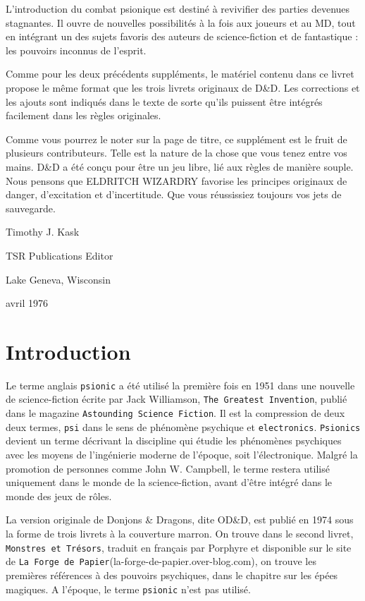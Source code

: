 \documentclass[12pt]{article}
\begin{document}
L'introduction du combat psionique est destiné à revivifier des parties devenues stagnantes. Il ouvre de nouvelles possibilités à la fois aux joueurs et au MD, tout en intégrant un des sujets favoris des auteurs de science-fiction et de fantastique : les pouvoirs inconnus de l'esprit.

Comme pour les deux précédents suppléments, le matériel contenu dans ce livret propose le même format que les trois livrets originaux de D\&D. Les corrections et les ajouts sont indiqués dans le texte de sorte qu'ils puissent être intégrés facilement dans les règles originales.

Comme vous pourrez le noter sur la page de titre, ce supplément est le fruit de plusieurs contributeurs. Telle est la nature de la chose que vous tenez entre vos mains. D\&D a été conçu pour être un jeu libre, lié aux règles de manière souple. Nous pensons que ELDRITCH WIZARDRY favorise les principes originaux de danger, d'excitation et d'incertitude. Que vous réussissiez toujours vos jets de sauvegarde.

\vspace{1cm}

\noindent Timothy J. Kask

\noindent TSR Publications Editor

\noindent Lake Geneva, Wisconsin

 avril 1976

\newpage

\section*{Introduction}

Le terme anglais \texttt{psionic} a été utilisé la première fois en 1951 dans une nouvelle de science-fiction écrite par Jack Williamson, \texttt{The Greatest Invention}, publié dans le magazine \texttt{Astounding Science Fiction}. Il est la compression de deux deux termes, \texttt{psi} dans le sens de phénomène psychique et \texttt{electronics}. \texttt{Psionics} devient un terme décrivant la discipline qui étudie les phénomènes psychiques avec les moyens de l'ingénierie moderne de l'époque, soit l'électronique. Malgré la promotion de personnes comme John W. Campbell, le terme restera utilisé uniquement dans le monde de la science-fiction, avant d'être intégré dans le monde des jeux de rôles.

La version originale de Donjons \& Dragons, dite OD\&D, est publié en 1974 sous la forme de trois livrets à la couverture marron. On trouve dans le second livret, \texttt{Monstres et Trésors}, traduit en français par Porphyre et disponible sur le site de \texttt{La Forge de Papier}(la-forge-de-papier.over-blog.com), on trouve les premières références à des pouvoirs psychiques, dans le chapitre sur les épées magiques. A l'époque, le terme \texttt{psionic} n'est pas utilisé.
\end{document}
